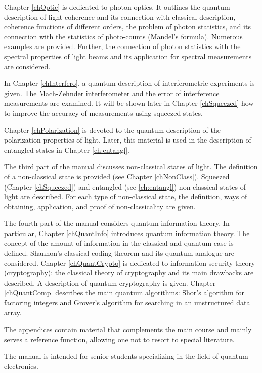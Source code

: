 Chapter \ref{chOptic} is dedicated to photon optics. It outlines the quantum description of light coherence and its connection with classical description, coherence functions of different orders, the problem of photon statistics, and its connection with the statistics of photo-counts (Mandel's formula). Numerous examples are provided. Further, the connection of photon statistics with the spectral properties of light beams and its application for spectral measurements are considered.

In Chapter \ref{chInterfero}, a quantum description of interferometric experiments is given. The Mach-Zehnder interferometer and the error of interference measurements are examined. It will be shown later in Chapter \ref{chSqueezed} how to improve the accuracy of measurements using squeezed states.

Chapter \ref{chPolarization} is devoted to the quantum description of the polarization properties of light. Later, this material is used in the description of entangled states in Chapter \ref{ch:entangl}.

The third part of the manual discusses non-classical states of light. The definition of a non-classical state is provided (see Chapter \ref{chNonClass}). Squeezed (Chapter \ref{chSqueezed}) and entangled (see \autoref{ch:entangl}) non-classical states of light are described. For each type of non-classical state, the definition, ways of obtaining, application, and proof of non-classicality are given.

The fourth part of the manual considers quantum information theory. In particular, Chapter \ref{chQuantInfo} introduces quantum information theory. The concept of the amount of information in the classical and quantum case is defined. Shannon's classical coding theorem and its quantum analogue are considered. Chapter \ref{chQuantCrypto} is dedicated to information security theory (cryptography): the classical theory of cryptography and its main drawbacks are described. A description of quantum cryptography is given. Chapter \ref{chQuantComp} describes the main quantum algorithms: Shor's algorithm for factoring integers and Grover's algorithm for searching in an unstructured data array.

The appendices contain material that complements the main course and mainly serves a reference function, allowing one not to resort to special literature.

The manual is intended for senior students specializing in the field of quantum electronics.